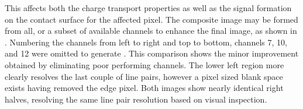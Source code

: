 \documentclass[../../main.tex]{subfiles}
\begin{document}
    This affects both the charge transport properties as well as the signal formation on the contact surface for the affected pixel.
    The composite image may be formed from all, or a subset of available channels to enhance the final image, as shown in .
    Numbering the channels from left to right and top to bottom, channels 7, 10, and 12 were omitted to generate .
    This comparison shows the minor improvement obtained by eliminating poor performing channels.
    The lower left region more clearly resolves the last couple of line pairs, however a pixel sized blank space exists having removed the edge pixel.
    Both images show nearly identical right halves, resolving the same line pair resolution based on visual inspection.
\end{document}
